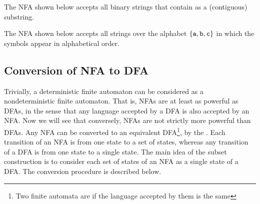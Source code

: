 \begin{Example}\label{ex:NFAContains110}
The NFA shown below accepts all binary strings that contain  as a (contiguous) substring.
\begin{center}
\end{center}
\end{Example}

\begin{Example}\label{ex:NFAabcAlphabetical}
The NFA shown below accepts all strings over the alphabet $\{\texttt a, \texttt b, \texttt c\}$ in which the symbols appear in alphabetical order.
\begin{center}
\end{center}
\end{Example}

\subsection{Conversion of NFA to DFA}\label{subsec:NFAtoDFA}

Trivially, a deterministic finite automaton can be considered as a nondeterministic finite automaton. That is, NFAs are at least as powerful as DFAs, in the sense that any language accepted by a DFA is also accepted by an NFA. Now we will see that conversely, NFAs are not strictly more powerful than DFAs. Any NFA can be converted to an equivalent DFA\footnote{Two finite automata are  if the language accepted by them is the same}, by the . Each transition of an NFA is from one state to a set of states, whereas any transition of a DFA is from one state to a single state. The main idea of the subset construction is to consider each set of states of an NFA as a single state of a DFA. The conversion procedure is described below.

